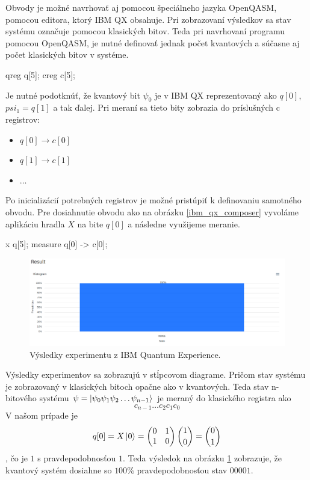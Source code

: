 Obvody je možné navrhovať aj pomocou špeciálneho jazyka OpenQASM, pomocou
editora, ktorý IBM QX obsahuje. Pri zobrazovaní výsledkov sa stav systému 
označuje pomocou klasických bitov. Teda pri navrhovaní programu pomocou
OpenQASM, je nutné definovať jednak počet kvantových a súčasne aj počet 
klasických bitov v systéme.

\begin{code}
qreg q[5];
creg c[5];
\end{code}

Je nutné podotknúť, že kvantový bit \(\psi_0\) je v IBM QX reprezentovaný
ako \(q[0]\), \(psi_1 = q[1]\) a tak ďalej. Pri meraní sa tieto bity zobrazia
do príslušných c registrov:
\begin{itemize}
\item[] \(q[0] \rightarrow c[0]\)
\item[] \(q[1] \rightarrow c[1]\)
\item[] \(\dots\)
\end{itemize}

Po inicializácií potrebných registrov je možné pristúpiť k definovaniu 
samotného obvodu. Pre dosiahnutie obvodu ako na obrázku \ref{ibm_qx_composer}
vyvoláme aplikáciu hradla \(X\) na bite \(q[0]\) a následne využijeme meranie.

\begin{code}
x q[5];
measure q[0] -> c[0];
\end{code}

\begin{figure} 
	\centering 
	\includegraphics[width=1\textwidth]{figures/ibm_qx_results.png} 
	\caption{Výsledky experimentu z IBM Quantum Experience.}
    \label{ibm_qx_results}
\end{figure}

Výsledky experimentov sa zobrazujú v stĺpcovom diagrame. Pričom stav systému
je zobrazovaný v klasických bitoch opačne ako v kvantových. Teda stav 
n-bitového systému \(\psi = \Ket{\psi_0\psi_1\psi_2 \dots \psi_{n-1}}\) je
meraný do klasického registra ako 
\[c_{n-1} \dots c_2 c_1 c_0\]
V našom prípade je
\[q[0] = X \Ket{0} =
\begin{pmatrix}
0 & 1\\
1 & 0\\
\end{pmatrix}
\binom{1}{0} = \binom{0}{1}
\]
, čo je \(1\) s pravdepodobnosťou \(1\). Teda výsledok na obrázku 
\ref{ibm_qx_results} zobrazuje, že kvantový systém dosiahne so \(100\%\) 
pravdepodobnosťou stav \(00001\).

